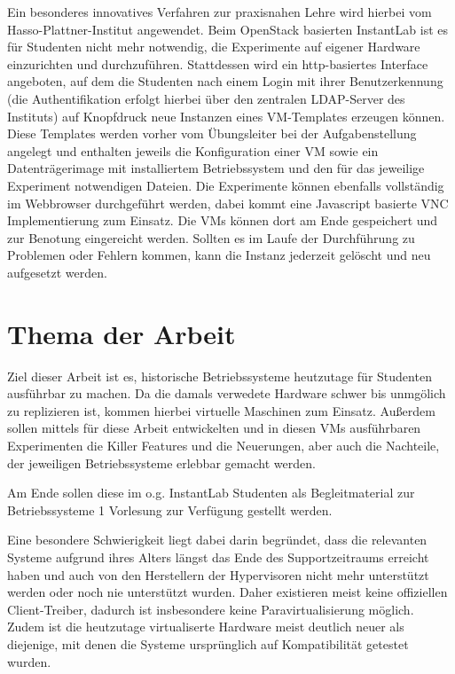 		Ein besonderes innovatives Verfahren zur praxisnahen Lehre wird hierbei vom Hasso-Plattner-Institut angewendet.
		Beim OpenStack basierten InstantLab ist es für Studenten nicht mehr notwendig, die Experimente auf eigener Hardware einzurichten und durchzuführen.
		Stattdessen wird ein http-basiertes Interface angeboten, auf dem die Studenten nach einem Login mit ihrer Benutzerkennung (die Authentifikation erfolgt hierbei über den zentralen LDAP-Server des Instituts) auf Knopfdruck neue Instanzen eines VM-Templates erzeugen können. 
		Diese Templates werden vorher vom Übungsleiter bei der Aufgabenstellung angelegt und enthalten jeweils die Konfiguration einer VM sowie ein Datenträgerimage mit installiertem Betriebssystem und den für das jeweilige Experiment notwendigen Dateien.
		Die Experimente können ebenfalls vollständig im Webbrowser durchgeführt werden, dabei kommt eine Javascript basierte VNC Implementierung zum Einsatz.
		Die VMs können dort am Ende gespeichert und zur Benotung eingereicht werden.
		Sollten es im Laufe der Durchführung zu Problemen oder Fehlern kommen, kann die Instanz jederzeit gelöscht und neu aufgesetzt werden.

\section{Thema der Arbeit}
\label{sec:topic}
			


		Ziel dieser Arbeit ist es, historische Betriebssysteme heutzutage für Studenten ausführbar zu machen.
		Da die damals verwedete Hardware schwer bis unmgölich zu replizieren ist, kommen hierbei virtuelle Maschinen zum Einsatz.
		Außerdem sollen mittels für diese Arbeit entwickelten und in diesen VMs ausführbaren Experimenten die Killer Features und die Neuerungen, aber auch die Nachteile, der jeweiligen Betriebssysteme erlebbar gemacht werden.

		Am Ende sollen diese im o.g. InstantLab Studenten als Begleitmaterial zur Betriebssysteme 1 Vorlesung zur Verfügung gestellt werden.
		
		Eine besondere Schwierigkeit liegt dabei darin begründet, dass die relevanten Systeme aufgrund ihres Alters längst das Ende des Supportzeitraums erreicht haben und auch von den Herstellern der Hypervisoren nicht mehr unterstützt werden oder noch nie unterstützt wurden.
		Daher existieren meist keine offiziellen Client-Treiber, dadurch ist insbesondere keine Paravirtualisierung möglich.
		Zudem ist die heutzutage virtualiserte Hardware meist deutlich neuer als diejenige, mit denen die Systeme ursprünglich auf Kompatibilität getestet wurden.

